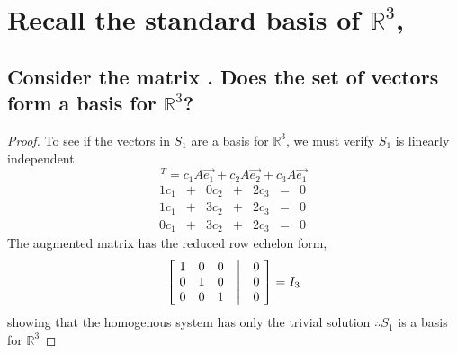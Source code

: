 \documentclass[../main.tex]{subfiles}
\begin{document}
\section{Recall the standard basis of
  $\mathbb{R}^3$, }
\subsection[Consider the matrix $A$ Does the set of vectors \DS{\{ A\vec{e_1},A\vec{e_2},A\vec{e_3} \}} form a basis for $\mathbb{R}^3$]
{Consider the matrix . Does the set of vectors  form a basis for $\mathbb{R}^3$?
}
\begin{proof}
  To see if the vectors in $S_{1}$ are a basis for $\mathbb{R}^3$, we must verify $S_{1}$ is linearly independent.
  \begin{equation*}
    [0\ 0\ 0]^{T} = c_{1}A\vec{e_1} + c_{2}A\vec{e_2} + c_{3}A\vec{e_1}
  \end{equation*}
  $$
    \begin{matrix}
      1c_{1} & + & 0c_{2} & + & 2c_{3} & = & 0 \ \\
      1c_{1} & + & 3c_{2} & + & 2c_{3} & = & 0 \ \\
      0c_{1} & + & 3c_{2} & + & 2c_{3} & = & 0 \
    \end{matrix}
  $$
  The augmented matrix has the reduced row echelon form,
  \begin{align*}
    \begin{bmatrix}
      \ 1 & 0 & 0 & \bigm| & 0\ \\
      \ 0 & 1 & 0 & \bigm| & 0\ \\
      \ 0 & 0 & 1 & \bigm| & 0\
    \end{bmatrix} = I_{3}
  \end{align*}
  showing that the homogenous system has only the trivial solution
  $\therefore {S_{1}}$ is a basis for $\mathbb{R}^3$
\end{proof}
\end{document}
